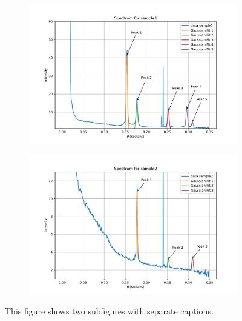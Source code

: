 \begin{figure}[H]
    \centering
    \begin{subfigure}[b]{0.99\textwidth} 
        \includegraphics[width=\textwidth]{Figures/gaussian_sample1.pdf}
        \label{fig:subfigure1}
    \end{subfigure}
    \begin{subfigure}[b]{0.99\textwidth} 
        \includegraphics[width=\textwidth]{Figures/gaussian_sample2.pdf}
        \label{fig:subfigure2}
    \end{subfigure}
    \caption{This figure shows two subfigures with separate captions.}
    \label{fig:result_figure}
\end{figure}

